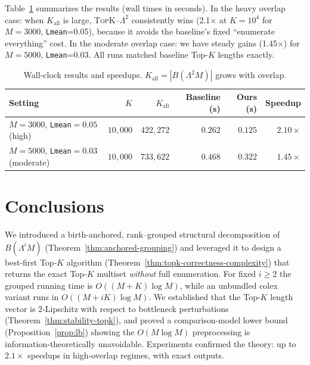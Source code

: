\documentclass[runningheads]{llncs}
\newcommand{\B}{B}
\newcommand{\Lam}{\Lambda}
\newcommand{\Kc}{K_{\text{all}}}
\newcommand{\ThmA}{Theorem~\ref{thm:anchored-grouping}}
\newcommand{\ThmB}{Theorem~\ref{thm:topk-correctness-complexity}}
\newcommand{\ThmE}{Theorem~\ref{thm:stability-topk}}
\newcommand{\PropF}{Proposition~\ref{prop:lb}}
\begin{document}
Table~\ref{tab:main-results} summarizes the results (wall times in seconds).
In the heavy overlap case: when $\Kc$ is large, \textsc{TopK--$\Lam^2$} consistently wins (2.1$\times$ at $K{=}10^4$ for $M{=}3000$, \texttt{Lmean}{=}0.05), because it avoids the baseline’s fixed “enumerate everything” cost.   
In the moderate overlap case: we have steady gains (1.45$\times$) for $M{=}5000$, \texttt{Lmean}{=}0.03.  
All runs matched baseline Top-$K$ lengths exactly.
\begin{table}[!h]
\centering
\caption{Wall-clock results and speedups. $\Kc=|\B(\Lam^2 M)|$ grows with overlap.}
\label{tab:main-results}
\begin{tabular}{lrrrrr}
\hline
Setting & $K$ & $\Kc$ & Baseline (s) & Ours (s) & Speedup \\
\hline
$M{=}3000$, \texttt{Lmean}$=0.05$ (high) & $10{,}000$ & $422{,}272$ & $0.262$ & $0.125$ & $\mathbf{2.10}\times$ \\
$M{=}5000$, \texttt{Lmean}$=0.03$ (moderate) & $10{,}000$ & $733{,}622$ & $0.468$ & $0.322$ & $1.45\times$ \\
\hline
\end{tabular}
\end{table}








\section{Conclusions}\label{sec:conclusion}

We introduced a birth-anchored, rank–grouped structural decomposition of $\B(\Lam^i M)$ (\ThmA) and leveraged it to design a best‑first Top‑$K$ algorithm (\ThmB) that returns the exact Top‑$K$ multiset \emph{without} full enumeration. For fixed $i\ge 2$ the grouped running time is $O((M+K)\log M)$, while an unbundled colex variant runs in $O((M+iK)\log M)$. We established that the Top-$K$ length vector is $2$‑Lipschitz with respect to bottleneck perturbations (\ThmE), and proved a comparison‑model lower bound (\PropF) showing the $O(M\log M)$ preprocessing is information‑theoretically unavoidable. Experiments confirmed the theory: up to $2.1\times$ speedups in high‑overlap regimes, with exact outputs.
\end{document}
